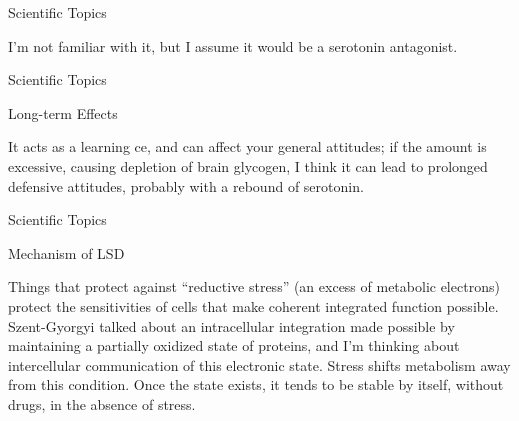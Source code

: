 \documentclass[11pt,oneside,openany,extrafontsizes]{memoir}
\begin{document}
\begin{standalonequote}{Scientific Topics}

    \begin{answer}
        I'm not familiar with it, but I assume it would be a serotonin antagonist.
    \end{answer}
\end{standalonequote}

\begin{standalonequote}{Scientific Topics}
    \begin{note}
        Long-term Effects
    \end{note}

    \begin{answer}
        It acts as a learning ce, and can affect your general attitudes; if the amount is excessive, causing depletion of brain glycogen, I think it can lead to prolonged defensive attitudes, probably with a rebound of serotonin.
    \end{answer}
\end{standalonequote}

\begin{standalonequote}{Scientific Topics}
    \begin{note}
        Mechanism of LSD
    \end{note}

    \begin{answer}
        Things that protect against \enquote{reductive stress} (an excess of metabolic electrons) protect the sensitivities of cells that make coherent integrated function possible. Szent-Gyorgyi talked about an intracellular integration made possible by maintaining a partially oxidized state of proteins, and I'm thinking about intercellular communication of this electronic state. Stress shifts metabolism away from this condition. Once the state exists, it tends to be stable by itself, without drugs, in the absence of stress.
    \end{answer}
\end{standalonequote}
\end{document}
